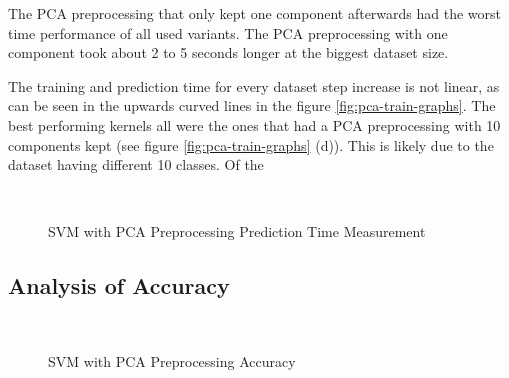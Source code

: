 \documentclass{article}[12pt]
\theoremstyle{mydef}
\begin{document}
            The PCA preprocessing that only kept one component afterwards had the worst time performance of all used variants. 
            The PCA preprocessing with one component took about 2 to 5 seconds longer at the biggest dataset size.

            The training and prediction time for every dataset step increase is not linear, as can be seen in the upwards curved lines in the figure \ref{fig:pca-train-graphs}.
            The best performing kernels all were the ones that had a PCA preprocessing with 10 components kept (see figure \ref{fig:pca-train-graphs} (d)). 
            This is likely due to the dataset having different 10 classes. 
            Of the 

            \begin{figure}[!h]
                \centering
                \quad
                \\
                \quad
                \caption{SVM with PCA Preprocessing Prediction Time Measurement}
                \label{fig:pca-predict-graphs}
            \end{figure}

        \subsection{Analysis of Accuracy}

            \begin{figure}[!h]
                \centering
                \quad
                \\
                \quad
                \caption{SVM with PCA Preprocessing Accuracy}
                \label{fig:pca-accuracy-graphs}
            \end{figure}
\end{document}
